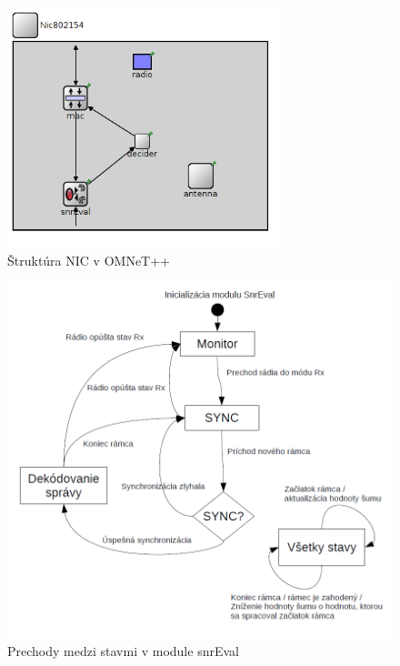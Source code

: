 \documentclass[11pt,twoside,a4paper]{book}
\begin{document}

\begin{figure}[h]
 \centering
 \includegraphics[width=8cm]{./figures/nic.png}
 \caption{Štruktúra NIC v OMNeT++}
 \label{fig:Nic}
\end{figure}

\begin{figure}[h]
 \centering
 \includegraphics[width=13cm]{./figures/snrEval.png}
 \caption{Prechody medzi stavmi v module snrEval}
 \label{fig:snrEval}
\end{figure}
\end{document}
